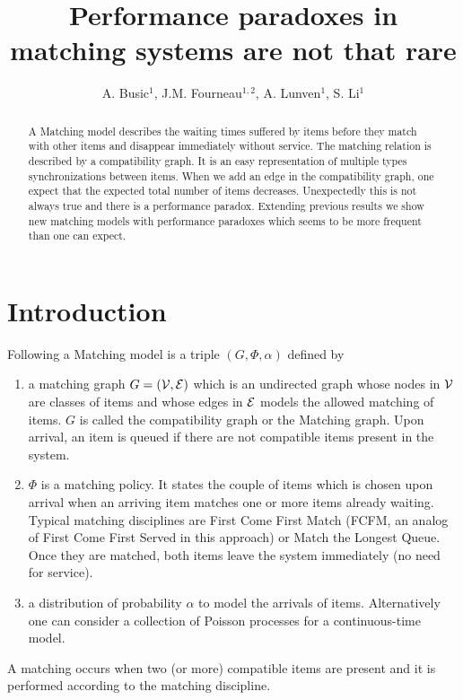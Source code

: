 \documentclass{llncs}
\begin{document}
\mainmatter  

\title{Performance paradoxes in matching systems are not that rare}

\author{A. Busic$^1$, J.M. Fourneau$^{1,2}$, A. Lunven$^1$, S. Li$^1$ }

\maketitle

\begin{abstract}
A Matching model describes the waiting times suffered by items before they match with other items 
and disappear immediately without service.  The matching relation is described by a compatibility graph. 
It is an easy representation of multiple types synchronizations 
between items. 
When we add an edge in the compatibility graph, one expect that the expected total number of items decreases. 
Unexpectedly this is not always true and there is a performance paradox. Extending previous results we show
new matching models with performance paradoxes which seems to be more frequent than one can expect. 
\end{abstract}


\section{Introduction} 


Following \cite{MaMo18} a Matching model is  a triple $( G, \Phi, \alpha) $ defined by 
\begin{enumerate}
\item a matching graph $G=(\cal{V},\cal{E})$ which is an undirected graph whose nodes in $\cal{V}$ are classes of items 
and whose edges in $\cal{E}$ models the allowed matching of items. $G$ is called the compatibility graph or the Matching graph. Upon arrival, an item is queued if there are not 
compatible items present in the system.

\item $\Phi$ is a matching policy. It states the couple of items which is chosen 
upon arrival when an arriving item matches one or more  items already waiting. Typical matching disciplines are First Come First Match (FCFM, an analog of First Come First Served in this approach) or Match the Longest Queue. 
Once they are matched, both items leave the system immediately (no need for service). 
\item a distribution of probability $\alpha$ to model the arrivals of items. Alternatively one can consider a collection of Poisson processes for
a continuous-time model. 
\end{enumerate} 
A matching occurs when two (or more) compatible items are present and it is performed 
according to the matching discipline. 
\end{document}
